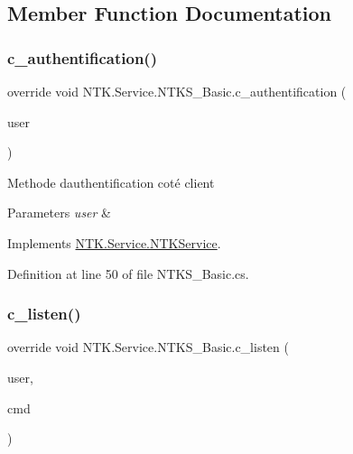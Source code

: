 \subsection{Member Function Documentation}
\mbox{\label{class_n_t_k_1_1_service_1_1_n_t_k_s___basic_a3cf6fce0651874b00a85d3a94515c059}} 
\subsubsection{\texorpdfstring{c\_authentification()}{c\_authentification()}}
{\footnotesize\ttfamily override void N\+T\+K.\+Service.\+N\+T\+K\+S\+\_\+\+Basic.\+c\+\_\+authentification (\begin{DoxyParamCaption}\item[{\mbox{\hyperlink{class_n_t_k_1_1_n_t_k_user}{N\+T\+K\+User}}}]{user }\end{DoxyParamCaption})\hspace{0.3cm}{\ttfamily [virtual]}}



Methode d\textquotesingle{}authentification coté client 


\begin{DoxyParams}{Parameters}
{\em user} & \\
\hline
\end{DoxyParams}


Implements \mbox{\hyperlink{class_n_t_k_1_1_service_1_1_n_t_k_service_a8c2fd33b41da5a4edf9911682dfd36cd}{N\+T\+K.\+Service.\+N\+T\+K\+Service}}.



Definition at line 50 of file N\+T\+K\+S\+\_\+\+Basic.\+cs.

\mbox{\label{class_n_t_k_1_1_service_1_1_n_t_k_s___basic_ae1e2c161689f944100438bcd61c9a99e}} 
\subsubsection{\texorpdfstring{c\_listen()}{c\_listen()}}
{\footnotesize\ttfamily override void N\+T\+K.\+Service.\+N\+T\+K\+S\+\_\+\+Basic.\+c\+\_\+listen (\begin{DoxyParamCaption}\item[{\mbox{\hyperlink{class_n_t_k_1_1_n_t_k_user}{N\+T\+K\+User}}}]{user,  }\item[{String}]{cmd }\end{DoxyParamCaption})\hspace{0.3cm}{\ttfamily [virtual]}}




